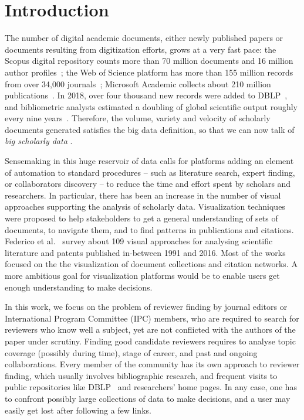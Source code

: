 \chapter{Introduction}
\label{sec:introduction}
The number of digital academic documents, either newly published papers or documents resulting from digitization efforts, grows at a very fast pace: the Scopus digital repository counts more than 70 million documents and 16 million author profiles~\cite{scopus}; the Web of Science platform has more than 155 million records from over 34,000 journals~\cite{WoS}; Microsoft Academic collects about 210 million publications~\cite{MA}. In 2018, over four thousand new records were added to DBLP~\cite{DBLPrate}, and bibliometric analysts estimated a doubling of global scientific output roughly every nine years~\cite{BoMu15}. Therefore, the volume, variety and velocity of scholarly documents generated satisfies the big data definition, so that we can now talk of \emph{big scholarly data} \cite{KhLi17}. 

Sensemaking in this huge reservoir of data calls for platforms adding an element of automation to standard procedures -- such as literature search, expert finding, or collaborators discovery -- to reduce the time and effort spent by scholars and researchers. In particular, there has been an increase in the number of visual approaches supporting the analysis of scholarly data. Visualization techniques were proposed to help stakeholders to get a general understanding of sets of documents, to navigate them, and to find patterns in publications and citations. Federico et al.~\cite{FeHe17} survey about 109 visual approaches for analysing scientific literature and patents published in-between 1991 and 2016. Most of the works focused on the the visualization of document collections and citation networks. A more ambitious goal for visualization platforms would be to enable users get enough understanding to make decisions. 

In this work, we focus on the problem of reviewer finding by journal editors or International Program Committee (IPC) members, who are required to search for reviewers who know well a subject, yet are not conflicted with the authors of the paper under scrutiny. Finding good candidate reviewers requires to analyse topic coverage (possibly during time), stage of career, and past and ongoing collaborations. Every member of the community has its own approach to reviewer finding, which usually involves bibliographic research, and frequent visits to public repositories like DBLP~\cite{ley2002dblp} and researchers' home pages. In any case, one has to confront possibly large collections of data to make decisions, and a user may easily get lost after following a few links.  

